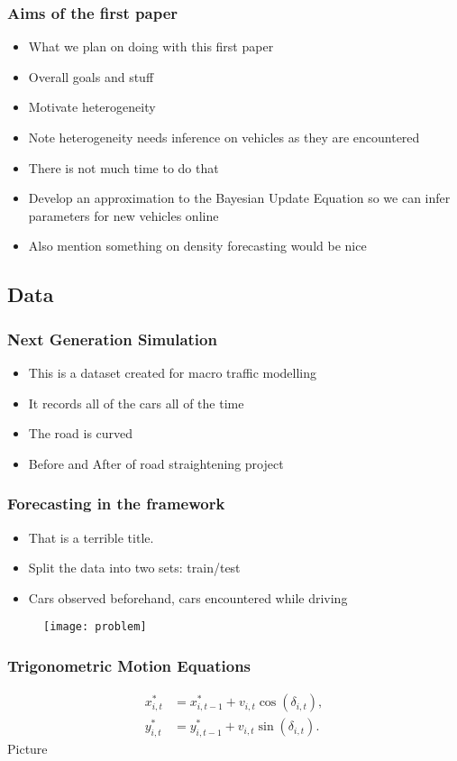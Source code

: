 \documentclass[8pt]{beamer}\usepackage[]{graphicx}\usepackage[]{color}
\begin{document}
\begin{frame}
\frametitle{Aims of the first paper}
\begin{itemize}
\item What we plan on doing with this first paper
\item Overall goals and stuff
\item Motivate heterogeneity
\item Note heterogeneity needs inference on vehicles as they are encountered
\item There is not much time to do that
\item Develop an approximation to the Bayesian Update Equation so we can infer parameters for new vehicles online
\item Also mention something on density forecasting would be nice
\end{itemize}
\end{frame}

\begin{frame}
\subsection{Data}
\frametitle{Next Generation Simulation}
\begin{itemize}
\item This is a dataset created for macro traffic modelling
\item It records all of the cars all of the time
\item The road is curved
\item Before and After of road straightening project
\end{itemize}
\end{frame}

\begin{frame}
\frametitle{Forecasting in the framework}
\begin{itemize}
\item That is a terrible title.
\item Split the data into two sets: train/test
\item Cars observed beforehand, cars encountered while driving
\end{itemize}
\begin{figure}
\centering
\texttt{[image: problem]}
\end{figure}
\end{frame}



\begin{frame}
\frametitle{Trigonometric Motion Equations}
\begin{align}
x^*_{i, t} &= x^*_{i, t-1} + v_{i, t} \cos(\delta_{i, t}) \label{xEq}, \\
y^*_{i, t} &= y^*_{i, t-1} + v_{i, t} \sin(\delta_{i, t}) \label{yEq}.
\end{align}
Picture
\end{frame}
\end{document}
